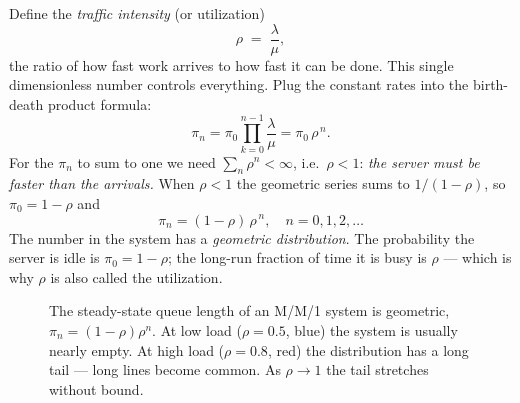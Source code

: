 Define the \emph{traffic intensity} (or utilization)
\[
  \rho \;=\; \frac{\lambda}{\mu},
\]
the ratio of how fast work arrives to how fast it can be done. This single dimensionless number
controls everything. Plug the constant rates into the birth-death product formula:
\[
  \pi_n = \pi_0 \prod_{k=0}^{n-1}\frac{\lambda}{\mu} = \pi_0\, \rho^{\,n}.
\]
For the $\pi_n$ to sum to one we need $\sum_n \rho^n < \infty$, i.e.\ $\rho < 1$: \emph{the server
must be faster than the arrivals.} When $\rho < 1$ the geometric series sums to $1/(1-\rho)$, so
$\pi_0 = 1 - \rho$ and
\[
  \boxed{\,\pi_n = (1-\rho)\,\rho^{\,n}, \quad n = 0, 1, 2, \dots\,}
\]
The number in the system has a \emph{geometric distribution}. The probability the server is idle is
$\pi_0 = 1-\rho$; the long-run fraction of time it is busy is $\rho$ --- which is why $\rho$ is also
called the utilization.

\begin{figure}[H]
\centering
{}
\caption{The steady-state queue length of an M/M/1 system is geometric, $\pi_n = (1-\rho)\rho^n$. At
low load ($\rho = 0.5$, blue) the system is usually nearly empty. At high load ($\rho = 0.8$, red)
the distribution has a long tail --- long lines become common. As $\rho \to 1$ the tail stretches
without bound.}
\label{ch27:fig-mm1}
\end{figure}

